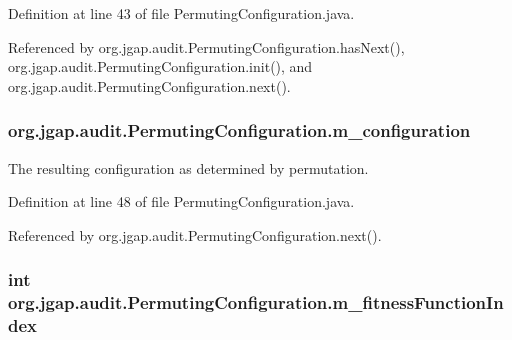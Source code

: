Definition at line 43 of file Permuting\-Configuration.\-java.



Referenced by org.\-jgap.\-audit.\-Permuting\-Configuration.\-has\-Next(), org.\-jgap.\-audit.\-Permuting\-Configuration.\-init(), and org.\-jgap.\-audit.\-Permuting\-Configuration.\-next().

\hypertarget{classorg_1_1jgap_1_1audit_1_1_permuting_configuration_a4834069c0160d4173a8f51ced97bf755}{
\subsubsection[{m\-\_\-configuration}]{ org.\-jgap.\-audit.\-Permuting\-Configuration.\-m\-\_\-configuration\hspace{0.3cm}{\ttfamily [private]}}}\label{classorg_1_1jgap_1_1audit_1_1_permuting_configuration_a4834069c0160d4173a8f51ced97bf755}
The resulting configuration as determined by permutation. 

Definition at line 48 of file Permuting\-Configuration.\-java.



Referenced by org.\-jgap.\-audit.\-Permuting\-Configuration.\-next().

\hypertarget{classorg_1_1jgap_1_1audit_1_1_permuting_configuration_ac9fea85f06f477393df26b75cdbd6534}{
\subsubsection[{m\-\_\-fitness\-Function\-Index}]{\setlength{\rightskip}{0pt plus 5cm}int org.\-jgap.\-audit.\-Permuting\-Configuration.\-m\-\_\-fitness\-Function\-Index\hspace{0.3cm}{\ttfamily [private]}}}\label{classorg_1_1jgap_1_1audit_1_1_permuting_configuration_ac9fea85f06f477393df26b75cdbd6534}


